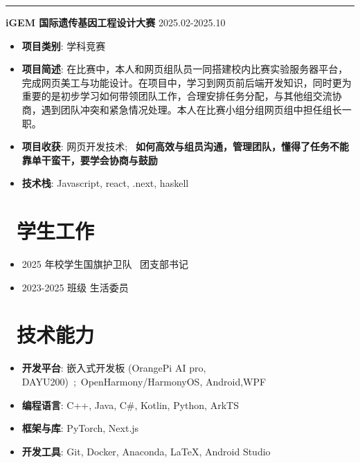 \documentclass[11pt]{article}
\begin{document}
\par\noindent\textcolor{black!20}{\rule{\linewidth}{0.5pt}}

\vspace*{0.1em}

\textbf{\large \color{CVBlue} iGEM 国际遗传基因工程设计大赛} \hfill 2025.02-2025.10
\begin{itemize}
    \item \textbf{项目类别}: 学科竞赛
    \item \textbf{项目简述}: 在比赛中，本人和网页组队员一同搭建校内比赛实验服务器平台，完成网页美工与功能设计。在项目中，学习到网页前后端开发知识，同时更为重要的是初步学习如何带领团队工作，合理安排任务分配，与其他组交流协商，遇到团队冲突和紧急情况处理。本人在比赛小组分组网页组中担任组长一职。
    \item[\textcolor{CVBlue}{\faStar}] \textbf{\textcolor{CVBlue}{项目收获}}: 网页开发技术; \ \textbf{如何高效与组员沟通，管理团队，懂得了任务不能靠单干蛮干，要学会协商与鼓励}
    \item \textbf{技术栈}: Javascript, react, .next, haskell
\end{itemize}

\vspace*{0.7em}

\section{\makebox[\widthof{\faGraduationCap}][c]{\color{CVBlue}\faUsers}\ 学生工作}
\begin{itemize}
	\item 2025 年校学生国旗护卫队 \ 团支部书记
	\item 2023-2025 班级 生活委员
\end{itemize}

\vspace*{0.7em}

\section{\makebox[\widthof{\faGraduationCap}][c]{\color{CVBlue}\faWrench}\ 技术能力}

\begin{itemize}
    \item \textbf{开发平台}: 嵌入式开发板 (OrangePi AI pro, DAYU200)\ ;\ OpenHarmony/HarmonyOS, Android,WPF 
    \item \textbf{编程语言}: C++, Java, C\#, Kotlin, Python, ArkTS
    \item \textbf{框架与库}: PyTorch,  Next.js
    \item \textbf{开发工具}: Git, Docker, Anaconda, \LaTeX{}, Android Studio
\end{itemize}


\end{document}
